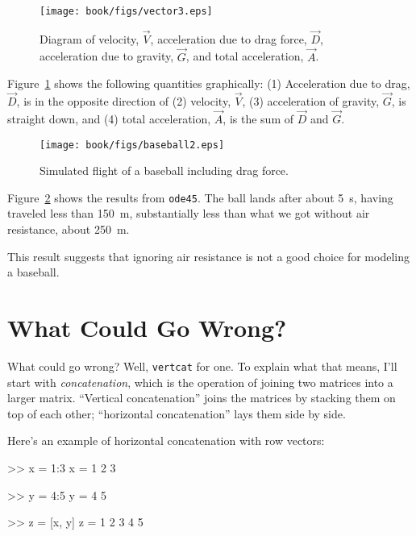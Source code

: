 \begin{figure}[ht]
\centerline{\texttt{[image: book/figs/vector3.eps]}}
\caption{Diagram of velocity, $\vec{V}$, acceleration due to drag force, 
$\vec{D}$, acceleration due to gravity, $\vec{G}$, and total acceleration, $\vec{A}$.}
\label{fig:vector3}
\end{figure}

Figure~\ref{fig:vector3} shows the following quantities graphically:  (1) Acceleration due to drag, $\vec{D}$, is in the opposite direction of (2) velocity, $\vec{V}$, (3) acceleration of gravity, $\vec{G}$, is straight down, and (4) total acceleration, $\vec{A}$, is the sum of $\vec{D}$ and $\vec{G}$.


\begin{figure}
\centerline{\texttt{[image: book/figs/baseball2.eps]}}
\caption{Simulated flight of a baseball including drag force.}
\label{fig:baseball2}
\end{figure}

Figure~\ref{fig:baseball2} shows the results from {\tt ode45}.  The ball lands after about \SI{5}{\second}, having traveled less than \SI{150}{\meter}, substantially less than what we got without air resistance, about \SI{250}{\meter}.

This result suggests that ignoring air resistance is not a good choice for modeling a baseball.


\section{What Could Go Wrong?}

What could go wrong?  Well, {\tt vertcat} for one.  To explain
what that means, I'll start with \emph{concatenation}, which is
the operation of joining two matrices into a larger matrix.
``Vertical concatenation'' joins the matrices by stacking them on
top of each other; ``horizontal concatenation'' lays them
side by side.


Here's an example of horizontal concatenation with row vectors:

\begin{code}
>> x = 1:3
x = 1     2     3

>> y = 4:5
y = 4     5

>> z = [x, y]
z = 1     2     3     4     5
\end{code}

